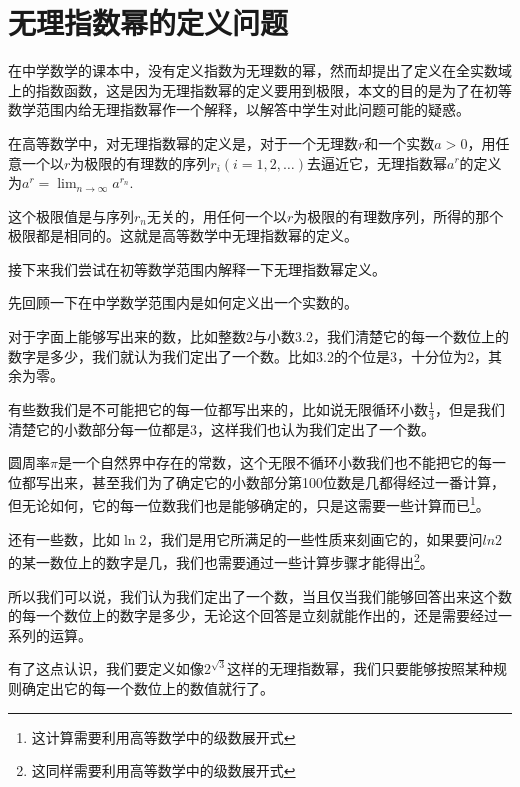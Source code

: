 
\section{无理指数幂的定义问题}
\label{sec:irrational-power}

在中学数学的课本中，没有定义指数为无理数的幂，然而却提出了定义在全实数域上的指数函数，这是因为无理指数幂的定义要用到极限，本文的目的是为了在初等数学范围内给无理指数幂作一个解释，以解答中学生对此问题可能的疑惑。

在高等数学中，对无理指数幂的定义是，对于一个无理数$r$和一个实数$a>0$，用任意一个以$r$为极限的有理数的序列$r_i(i=1,2,\ldots)$去逼近它，无理指数幂$a^r$的定义为$a^r=\lim_{n \to \infty}a^{r_n}$.

这个极限值是与序列$r_n$无关的，用任何一个以$r$为极限的有理数序列，所得的那个极限都是相同的。这就是高等数学中无理指数幂的定义。

接下来我们尝试在初等数学范围内解释一下无理指数幂定义。

先回顾一下在中学数学范围内是如何定义出一个实数的。

对于字面上能够写出来的数，比如整数2与小数3.2，我们清楚它的每一个数位上的数字是多少，我们就认为我们定出了一个数。比如3.2的个位是3，十分位为2，其余为零。

有些数我们是不可能把它的每一位都写出来的，比如说无限循环小数$\frac{1}{3}$，但是我们清楚它的小数部分每一位都是3，这样我们也认为我们定出了一个数。

圆周率$\pi$是一个自然界中存在的常数，这个无限不循环小数我们也不能把它的每一位都写出来，甚至我们为了确定它的小数部分第100位数是几都得经过一番计算，但无论如何，它的每一位数我们也是能够确定的，只是这需要一些计算而已\footnote{这计算需要利用高等数学中的级数展开式}。

还有一些数，比如$\ln{2}$，我们是用它所满足的一些性质来刻画它的，如果要问$ln2$的某一数位上的数字是几，我们也需要通过一些计算步骤才能得出\footnote{这同样需要利用高等数学中的级数展开式}。

所以我们可以说，我们认为我们定出了一个数，当且仅当我们能够回答出来这个数的每一个数位上的数字是多少，无论这个回答是立刻就能作出的，还是需要经过一系列的运算。

有了这点认识，我们要定义如像$2^{\sqrt{3}}$这样的无理指数幂，我们只要能够按照某种规则确定出它的每一个数位上的数值就行了。


